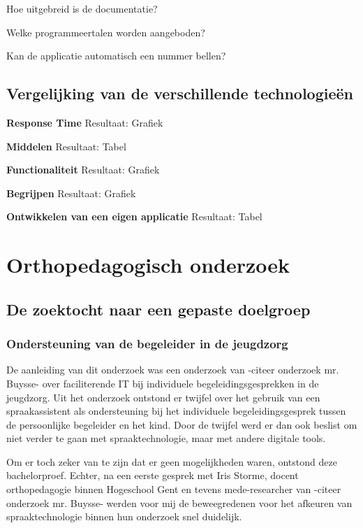 Hoe uitgebreid is de documentatie?

Welke programmeertalen worden aangeboden?

Kan de applicatie automatisch een nummer bellen?

\subsection{Vergelijking van de verschillende technologieën}
\label{sec:vergelijking van de onderzochte technologieën}
\textbf{Response Time}
Resultaat: Grafiek

\textbf{Middelen}
Resultaat: Tabel

\textbf{Functionaliteit}
Resultaat: Grafiek

\textbf{Begrijpen}
Resultaat: Grafiek

\textbf{Ontwikkelen van een eigen applicatie}
Resultaat: Tabel

\section{Orthopedagogisch onderzoek}
\label{Orthopedagogisch onderzoek}
\subsection{De zoektocht naar een gepaste doelgroep}
\label{De zoektocht naar een gepaste doelgroep}

\subsubsection{Ondersteuning van de begeleider in de jeugdzorg}
\label{ondersteuning van de begeleider in de jeugdzorg}
De aanleiding van dit onderzoek was een onderzoek van -citeer onderzoek mr. Buysse- over faciliterende IT bij individuele begeleidingsgesprekken in de jeugdzorg. Uit het onderzoek ontstond er twijfel over het gebruik van een spraakassistent als ondersteuning bij het individuele begeleidingsgesprek tussen de persoonlijke begeleider en het kind. Door de twijfel werd er dan ook beslist om niet verder te gaan met spraaktechnologie, maar met andere digitale tools.

Om er toch zeker van te zijn dat er geen mogelijkheden waren, ontstond deze bachelorproef. Echter, na een eerste gesprek met Iris Storme, docent orthopedagogie binnen Hogeschool Gent en tevens mede-researcher van -citeer onderzoek mr. Buysse- werden voor mij de beweegredenen voor het afkeuren van spraaktechnologie binnen hun onderzoek snel duidelijk. 

